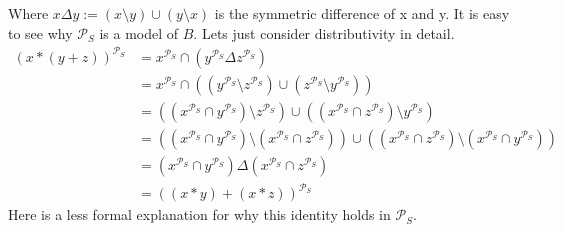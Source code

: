 	Where $x\Delta y:=(x\setminus y)\cup(y\setminus x)$ is the symmetric difference of x and y. It is easy to see why $\mathcal{P}_S$ is a model of $B$. Lets just consider distributivity in detail.
	\begin{align*}
		\left( x*\left( y+z\right) \right) ^{\mathcal{P}_S} & =x^{\mathcal{P}_S}\cap\left( y^{\mathcal{P}_S}\Delta z^{\mathcal{P}_S}\right)                                                                                                                                  \\
		                          & =x^{\mathcal{P}_S}\cap\left( \left( y^{\mathcal{P}_S}\setminus z^{\mathcal{P}_S}\right) \cup\left( z^{\mathcal{P}_S}\setminus y^{\mathcal{P}_S}\right) \right)                                                                           \\
		                          & =\left( \left( x^{\mathcal{P}_S}\cap y^{\mathcal{P}_S}\right) \setminus z^{\mathcal{P}_S}\right) \cup\left( \left( x^{\mathcal{P}_S}\cap z^{\mathcal{P}_S}\right) \setminus y^{\mathcal{P}_S}\right)                                                  \\
		                          & =\left( \left( x^{\mathcal{P}_S}\cap y^{\mathcal{P}_S}\right) \setminus \left( x^{\mathcal{P}_S}\cap z^{\mathcal{P}_S}\right) \right) \cup\left( \left( x^{\mathcal{P}_S}\cap z^{\mathcal{P}_S}\right) \setminus \left( x^{\mathcal{P}_S}\cap y^{\mathcal{P}_S}\right) \right)  \\
		                          & =\left( x^{\mathcal{P}_S}\cap y^{\mathcal{P}_S}\right) \Delta \left( x^{\mathcal{P}_S}\cap z^{\mathcal{P}_S}\right)                                                                                                         \\
		                          & =\left( \left( x*y\right) +\left( x*z\right)\right)^{\mathcal{P}_S}                                                                                                                                                                    
	\end{align*}
	Here is a less formal explanation for why this identity holds in $\mathcal{P}_S$.\\
	\def\f{1.3}
	\def\CircleX{(\f*0.5,\f*0.866) circle (\f*0.8)}
	\def\CircleY{(\f*0,0) circle (\f*0.8)}
	\def\CircleZ{(\f*1,0) circle (\f*0.8)}
